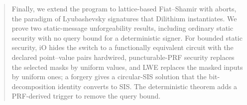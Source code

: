 \documentclass[twoside,envcountsame,runningheads]{llncs}
\newcounter{paperpart}
\renewcommand{\thepaperpart}{\Roman{paperpart}}
\newcommand{\paperpart}[2]{\par\refstepcounter{paperpart}\vspace{3.5ex}\begin{center}{\bfseries\large Part \thepaperpart}\\[0.5ex]{\bfseries\Large #1}\end{center}\vspace{1.5ex}\label{#2}}
\begin{document}
\begin{abstract}
   \quad\quad Finally, we extend the program to lattice-based Fiat--Shamir with aborts, the paradigm of Lyubashevsky signatures that Dilithium instantiates. We prove two static-message unforgeability results, including ordinary static security with no query bound for a deterministic signer. For bounded static security, iO hides the switch to a functionally equivalent circuit with the declared point--value pairs hardwired, puncturable-PRF security replaces the selected masks by uniform values, and LWE replaces the masked inputs by uniform ones; a forgery gives a circular-SIS solution that the bit-decomposition identity converts to SIS. The deterministic theorem adds a PRF-derived trigger to remove the query bound.

\end{abstract}

% 
% 


% 
% 
% 


% 

% 





\appendix
% 
\end{document}
